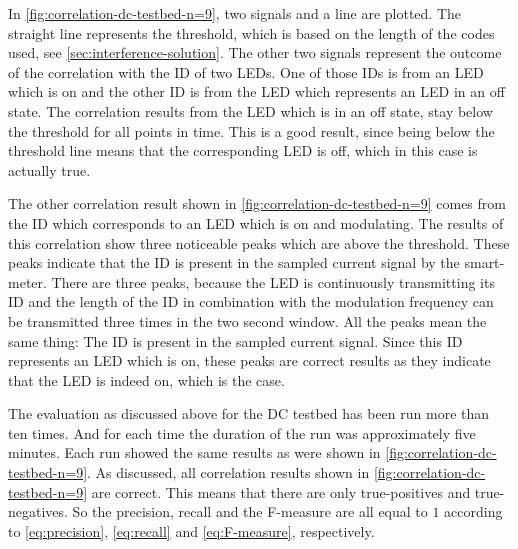 In \autoref{fig:correlation-dc-testbed-n=9}, two signals and a line are plotted.
The straight line represents the threshold, which is based on the length of the codes used, see \autoref{sec:interference-solution}.
The other two signals represent the outcome of the correlation with the ID of two LEDs.
One of those IDs is from an LED which is on and the other ID is from the LED which represents an LED in an off state.
The correlation results from the LED which is in an off state, stay below the threshold for all points in time.
This is a good result, since being below the threshold line means that the corresponding LED is off, which in this case is actually true.

The other correlation result shown in \autoref{fig:correlation-dc-testbed-n=9} comes from the ID which corresponds to an LED which is on and modulating.
The results of this correlation show three noticeable peaks which are above the threshold.
These peaks indicate that the ID is present in the sampled current signal by the smart-meter.
There are three peaks, because the LED is continuously transmitting its ID and the length of the ID in combination with the modulation frequency can be transmitted three times in the two second window.
All the peaks mean the same thing: The ID is present in the sampled current signal.
Since this ID represents an LED which is on, these peaks are correct results as they indicate that the LED is indeed on, which is the case.



The evaluation as discussed above for the DC testbed has been run more than ten times.
And for each time the duration of the run was approximately five minutes.
Each run showed the same results as were shown in \autoref{fig:correlation-dc-testbed-n=9}.
As discussed, all correlation results shown in \autoref{fig:correlation-dc-testbed-n=9} are correct.
This means that there are only true-positives and true-negatives.
So the precision, recall and the F-measure are all equal to $1$ according to \autoref{eq:precision}, \autoref{eq:recall} and \autoref{eq:F-measure}, respectively.


